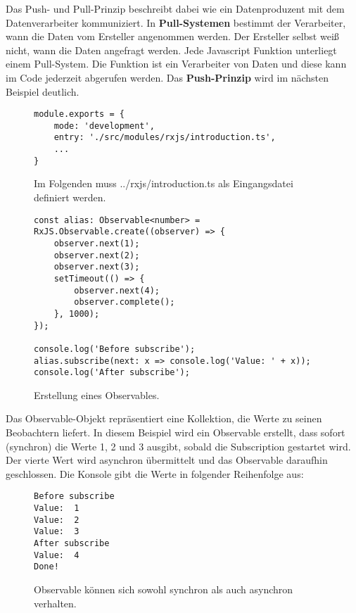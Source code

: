 \noindent
Das Push- und Pull-Prinzip beschreibt dabei wie ein Datenproduzent mit dem Datenverarbeiter kommuniziert. In \textbf{Pull-Systemen} bestimmt der Verarbeiter, wann die Daten vom Ersteller angenommen werden. Der Ersteller selbst weiß nicht, wann die Daten angefragt werden. Jede Javascript Funktion unterliegt einem Pull-System. Die Funktion ist ein Verarbeiter von Daten und diese kann im Code jederzeit abgerufen werden. Das \textbf{Push-Prinzip} wird im nächsten Beispiel deutlich. 

\begin{figure}[H]
\begin{lstlisting}[basicstyle=\small]
module.exports = {
    mode: 'development',
    entry: './src/modules/rxjs/introduction.ts',
    ...
}
\end{lstlisting}
\caption{Im Folgenden muss ../rxjs/introduction.ts als Eingangsdatei definiert werden.}
\end{figure}

\begin{figure}[H]
\begin{lstlisting}[basicstyle=\small]
const alias: Observable<number> = RxJS.Observable.create((observer) => {
    observer.next(1);
    observer.next(2);
    observer.next(3);
    setTimeout(() => {
        observer.next(4);
        observer.complete();
    }, 1000);
});

console.log('Before subscribe');
alias.subscribe(next: x => console.log('Value: ' + x));
console.log('After subscribe');
\end{lstlisting}
\caption{Erstellung eines Observables.}
\label{creation-of-observable-first-example}
\end{figure}

\noindent
Das Observable-Objekt repräsentiert eine Kollektion, die Werte zu seinen Beobachtern liefert. In diesem Beispiel wird ein Observable erstellt, dass sofort (synchron) die Werte 1, 2 und 3 ausgibt, sobald die Subscription gestartet wird. Der vierte Wert wird asynchron übermittelt und das Observable daraufhin geschlossen. Die Konsole gibt die Werte in folgender Reihenfolge aus:

\begin{figure}[H]
\begin{lstlisting}
Before subscribe
Value:  1
Value:  2
Value:  3
After subscribe
Value:  4
Done!
\end{lstlisting}
\caption{Observable können sich sowohl synchron als auch asynchron verhalten.}
\end{figure}


